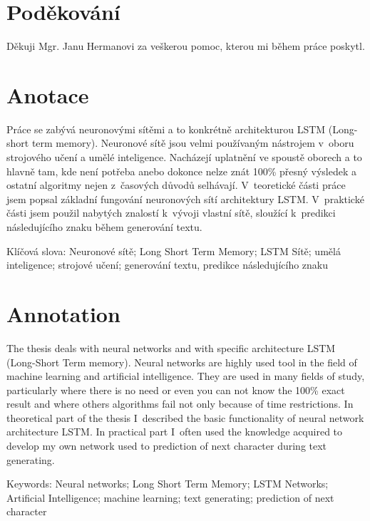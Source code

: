 \documentclass[a4paper]{article}
\begin{document}
\section*{Poděkování}
Děkuji Mgr. Janu Hermanovi za veškerou pomoc, kterou mi během práce poskytl. 
\clearpage
\thispagestyle{empty}
\section*{Anotace}
Práce se zabývá neuronovými sítěmi a to konkrétně architekturou LSTM (Long-short term memory). Neuronové sítě jsou velmi používaným nástrojem v~oboru strojového učení a umělé inteligence. Nacházejí uplatnění ve spoustě oborech a to hlavně tam, kde není potřeba anebo dokonce nelze znát 100\% přesný výsledek a ostatní algoritmy nejen z~časových důvodů selhávají. V~teoretické části práce jsem popsal základní fungování neuronových sítí architektury LSTM. V~praktické části jsem použil nabytých znalostí k~vývoji vlastní sítě, sloužící k~predikci následujícího znaku během generování textu.\par
Klíčová slova: Neuronové sítě; Long Short Term Memory; LSTM Sítě; umělá inteligence; strojové učení; generování textu, predikce následujícího znaku
\section*{Annotation}
The thesis deals with neural networks and with specific architecture LSTM (Long-Short Term memory). Neural networks are highly used tool in the field of machine learning and artificial intelligence. They are used in many fields of study, particularly where there is no need or even you can not know the 100\% exact result and where others algorithms fail not only because of time restrictions. In theoretical part of the thesis I~described the basic functionality of neural network architecture LSTM. In practical part I~often used the knowledge acquired to develop my own network used to prediction of next character during text generating.\par
Keywords: Neural networks; Long Short Term Memory; LSTM Networks; Artificial Intelligence; machine learning; text generating; prediction of next character
\newpage
\tableofcontents
\newpage
\end{document}
